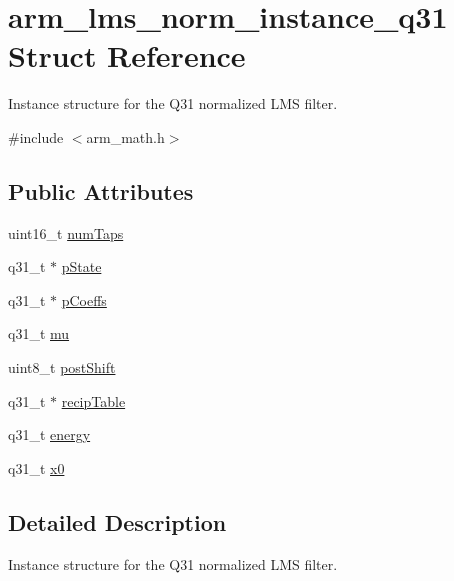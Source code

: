 \hypertarget{structarm__lms__norm__instance__q31}{\section{arm\-\_\-lms\-\_\-norm\-\_\-instance\-\_\-q31 Struct Reference}
\label{structarm__lms__norm__instance__q31}
}


Instance structure for the Q31 normalized L\-M\-S filter.  




{\ttfamily \#include $<$arm\-\_\-math.\-h$>$}

\subsection*{Public Attributes}
\begin{DoxyCompactItemize}
\item 
uint16\-\_\-t \hyperlink{structarm__lms__norm__instance__q31_a28e4c085af69c9c3e2e95dacf8004c3e}{num\-Taps}
\item 
q31\-\_\-t $\ast$ \hyperlink{structarm__lms__norm__instance__q31_a6b25c96cf048b77078d62f4252a01ec4}{p\-State}
\item 
q31\-\_\-t $\ast$ \hyperlink{structarm__lms__norm__instance__q31_a57a64c1ff102d033c1bd05043f1d9955}{p\-Coeffs}
\item 
q31\-\_\-t \hyperlink{structarm__lms__norm__instance__q31_ad3dd2a2406e02fdaa7782ba6c3940a64}{mu}
\item 
uint8\-\_\-t \hyperlink{structarm__lms__norm__instance__q31_a28d7b9e437817f83397e081967e90f3c}{post\-Shift}
\item 
q31\-\_\-t $\ast$ \hyperlink{structarm__lms__norm__instance__q31_a85836d0907077b9ac660f7bbbaa9d694}{recip\-Table}
\item 
q31\-\_\-t \hyperlink{structarm__lms__norm__instance__q31_a3c0ae42869afec8555dc8e3a7ef9b386}{energy}
\item 
q31\-\_\-t \hyperlink{structarm__lms__norm__instance__q31_a47c4466d644e0d8ba407995adfa9b917}{x0}
\end{DoxyCompactItemize}


\subsection{Detailed Description}
Instance structure for the Q31 normalized L\-M\-S filter. 

